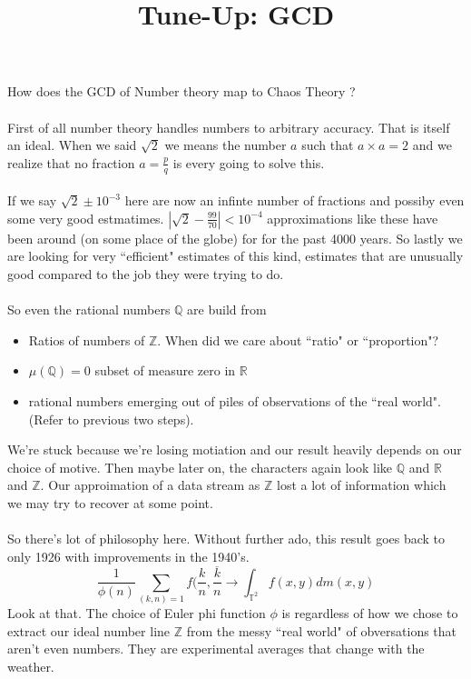\documentclass[12pt]{article}
\title{Tune-Up: GCD}
\date{}
\begin{document}
\sffamily

\maketitle

{\fontsize{16pt}{16pt}\selectfont 

\noindent  How does the GCD of Number theory map to Chaos Theory ? \\ \\
First of all number theory handles numbers to arbitrary accuracy.  That is itself an ideal.  When we said $\sqrt{2}$ we means the number $a$ such that $a  \times a = 2$ and we realize that no fraction $a = \frac{p}{q}$ is every going to solve this. \\ \\
If we say $\sqrt{2} \pm 10^{-3}$ here are now an infinte number of fractions and possiby even some very good estmatimes.  $|\sqrt{2} - \frac{99}{70}| < 10^{-4}$ approximations like these have been around (on some place of the globe) for for the past 4000 years.  So lastly we are looking for very ``efficient" estimates of this kind, estimates that are unusually good compared to the job they were trying to do. \\ \\
So even the rational numbers $\mathbb{Q}$ are build from 
\begin{itemize}
\item Ratios of numbers of $\mathbb{Z}$.  When did we care about ``ratio" or  ``proportion"?  
\item $\mu(\mathbb{Q}) = 0$ subset of measure zero in $\mathbb{R}$
\item rational numbers emerging out of piles of observations of the ``real world".  (Refer to previous two steps). 
\end{itemize}
We're stuck because we're losing motiation and our result heavily depends on our choice of motive.  Then maybe later on, the characters again look like $\mathbb{Q}$ and $\mathbb{R}$ and $\mathbb{Z}$.  Our approimation of a data stream as $\mathbb{Z}$ lost a lot of information which we may try to recover at some point.  \\ \\
So there's lot of philosophy here.  Without further ado, this result goes back to only 1926 with improvements in the 1940's.
$$ \frac{1}{\phi(n)} \sum_{(k,n) = 1} f(\frac{k}{n}, \frac{\overline{k}}{n} \to \int_{\mathbb{T}^2} f(x,y) dm(x,y)$$
Look at that.  The choice of Euler phi function $\phi$ is regardless of how we chose to extract our ideal number line $\mathbb{Z}$ from the messy ``real world" of obversations that aren't even numbers.  They are experimental averages that change with the weather. \\ \\
}
\end{document}

